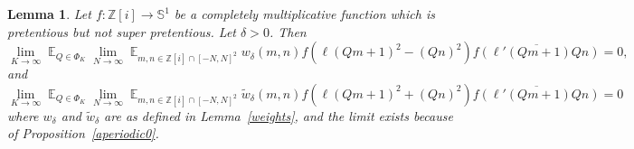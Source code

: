 \documentclass[11pt]{amsart}
\newtheorem{lemma}{Lemma}[section]
\theoremstyle{definition}
\DeclareMathOperator*{\E}{\mathbb{E}}
\renewcommand{\S}{\mathbb{S}}
\newcommand{\Z}{{\mathbb Z}}
\begin{document}
\begin{lemma}
    Let $f\colon \Z[i]\to\S^{1}$ be a completely multiplicative function which is pretentious but not super pretentious. Let $\delta>0$. Then
    \begin{equation} \label{e116}
    \lim_{K\to\infty}\E_{Q\in \Phi_{K}}\lim_{N \to \infty} \E_{m,n\in \Z[i] \cap [-N,N]^2} w_{\delta}(m,n)f(\ell(Qm+1)^2-(Qn)^2)\overline{f(\ell'(Qm+1)Qn)}=0,
\end{equation}
and
\begin{equation}\label{weight2withf}
    \lim_{K\to\infty}\E_{Q\in \Phi_{K}}\lim_{N \to \infty} \E_{m,n\in \Z[i] \cap [-N,N]^2} \tilde{w}_{\delta}(m,n)f(\ell(Qm+1)^2+(Qn)^2)\overline{f(\ell'(Qm+1)Qn)}=0
\end{equation}
where $w_{\delta}$ and $\tilde{w}_{\delta}$ are as defined in Lemma~\ref{weights}, and the limit exists because of Proposition~\ref{aperiodic0}.
\end{lemma}
\end{document}
